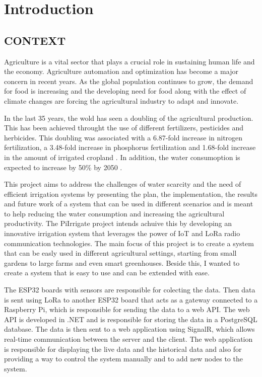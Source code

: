 \chapter{Introduction}\label{section:introduction}
\thispagestyle{pagestyle}


\section{CONTEXT}

Agriculture is a vital sector that plays a crucial role in sustaining human life and the economy.
Agriculture automation and optimization has become a major concern in recent years. 
As the global population continues to grow, the demand for food is increasing and the developing need for food
along with the effect of climate changes are forcing the agricultural industry to adapt and innovate\cite{OBAIDEEN2022100124}.

In the last 35 years, the wold has seen a doubling of the agricultural production. This has been achieved throught the use
of different fertilizers, pesticides and herbicides. This doubling was associated with a 6.87-fold increase in nitrogen fertilization,
a 3.48-fold increase in phosphorus fertilization and 1.68-fold increase in the amount of irrigated cropland \cite{doi:10.1073/pnas.96.11.5995}.
In addition, the water consumoption is expected to increase by 50\% by 2050 \cite{s20236865}. 

This project aims to address the challenges of water scarcity and the need of efficient irrigation systems
by presenting the plan, the implementation, the results and future work of a system that can be used in different
scenarios and is meant to help reducing the water consumption and increasing the agricultural productivity.
The PiIrrigate project intends achuive this by developing an innovative irrigation system that leverages the power of 
IoT and LoRa radio communication technologies.  
The main focus of this project is to create a system that can be easly used in different agricultural settings, 
starting from small gardens to large farms and even smart greenhouses. Beside this, I wanted to create a system that 
is easy to use and can be extended with ease. 

The ESP32 boards with sensors are responsible for colecting the data. Then data is sent using  LoRa to another
ESP32 board that acts as a gateway connected to a Raspberry Pi, which is responsible for sending the data to a web API.
The web API is developed in .NET and is responsible for storing the data in a PostgreSQL database.
The data is then sent to a web application using SignalR, which allows real-time communication between the server and the client.
The web application is responsible for displaying the live data and the historical data and also for providing a way to
control the system manually and to add new nodes to the system. 

